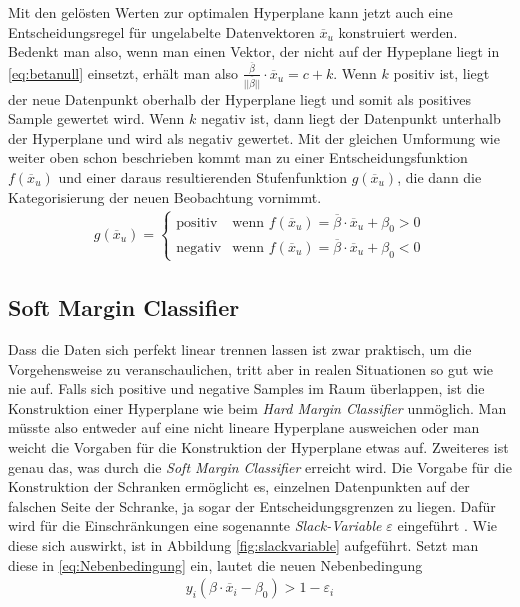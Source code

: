 \documentclass[
]{article}
\begin{document}
Mit den gelösten Werten zur optimalen Hyperplane kann jetzt auch eine
Entscheidungsregel für ungelabelte Datenvektoren \(\overline{x}_u\)
konstruiert werden. Bedenkt man also, wenn man einen Vektor, der nicht
auf der Hypeplane liegt in \eqref{eq:betanull} einsetzt, erhält man also
\(\frac{\overline \beta}{||\overline{\beta}||}\cdot \overline{x}_u=c+k\).
Wenn \(k\) positiv ist, liegt der neue Datenpunkt oberhalb der
Hyperplane liegt und somit als positives Sample gewertet wird. Wenn
\(k\) negativ ist, dann liegt der Datenpunkt unterhalb der Hyperplane
und wird als negativ gewertet. Mit der gleichen Umformung wie weiter
oben schon beschrieben kommt man zu einer Entscheidungsfunktion
\(f(\overline{x}_u)\) und einer daraus resultierenden Stufenfunktion
\(g(\overline{x}_u)\), die dann die Kategorisierung der neuen
Beobachtung vornimmt. \begin{align}
g(\overline{x}_u)=\begin{cases}\mathrm{positiv}&\text{wenn } f(\overline{x}_u)=\overline{\beta}\cdot \overline{x}_u+\beta_0 > 0\\
\mathrm{negativ} & \text{wenn }f(\overline{x}_u)=\overline{\beta}\cdot \overline{x}_u+\beta_0<0
\end{cases}\label{eq:decisionf}
\end{align}

\subsection{Soft Margin Classifier}

Dass die Daten sich perfekt linear trennen lassen ist zwar praktisch, um
die Vorgehensweise zu veranschaulichen, tritt aber in realen Situationen
so gut wie nie auf. Falls sich positive und negative Samples im Raum
überlappen, ist die Konstruktion einer Hyperplane wie beim
\textit{Hard Margin Classifier} unmöglich. Man müsste also entweder auf
eine nicht lineare Hyperplane ausweichen oder man weicht die Vorgaben
für die Konstruktion der Hyperplane etwas auf. Zweiteres ist genau das,
was durch die \textit{Soft Margin Classifier} erreicht wird. Die Vorgabe
für die Konstruktion der Schranken ermöglicht es, einzelnen Datenpunkten
auf der falschen Seite der Schranke, ja sogar der Entscheidungsgrenzen
zu liegen. Dafür wird für die Einschränkungen eine sogenannte
\textit{Slack-Variable} \(\varepsilon\) eingeführt
\parencite{jamesIntroductionStatisticalLearning2021}. Wie diese sich
auswirkt, ist in Abbildung \ref{fig:slackvariable} aufgeführt. Setzt man
diese in \eqref{eq:Nebenbedingung} ein, lautet die neuen Nebenbedingung
\begin{align}
y_i(\beta \cdot \overline{x}_i-\beta_0)>1- \varepsilon_i \label{eq:nebbedsfm}
\end{align}
\end{document}
